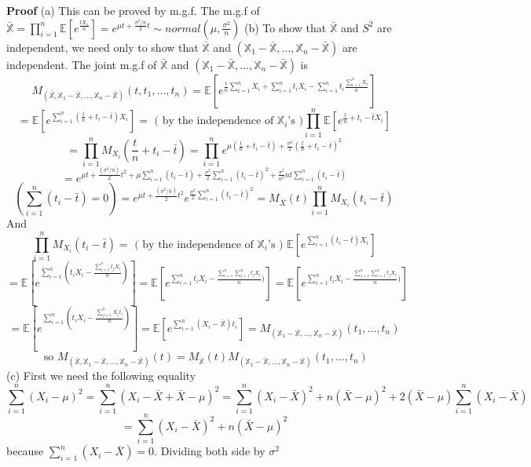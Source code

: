 \documentclass[a4paper,12pt]{article}
\begin{document}
\textbf{Proof} 
(a) This can be proved by m.g.f. The m.g.f of $\bar{\mathbb{X}} = \prod_{i=1}^n \mathbb{E}[e^{\frac{tX_1}{n}}] = e^{\mu t + \frac{\sigma^2 / n}{2}t} \sim normal(\mu, \frac{\sigma^2}{n})$ 
(b) To show that $\bar{\mathbb{X}}$ and $S^2$ are independent, we need only to show that $\bar{\mathbb{X}}$ and $(\mathbb{X}_1-\bar{\mathbb{X}}, ..., \mathbb{X}_n-\bar{\mathbb{X}})$ are independent.
The joint m.g.f of $\bar{\mathbb{X}}$ and $(\mathbb{X}_1-\bar{\mathbb{X}}, ..., \mathbb{X}_n-\bar{\mathbb{X}})$ is
$$M_{(\bar{\mathbb{X}}, \mathbb{X}_1-\bar{\mathbb{X}}, ..., \mathbb{X}_n-\bar{\mathbb{X}})}( t, t_1, ..., t_n ) = \mathbb{E}[e^{ \frac{t}{n}\sum_{i=1}^n X_i + \sum_{i=1}^n t_i X_i - \sum_{i=1}^n t_i \frac{\sum_{i=1}^n X_i}{n} }]$$
$$= \mathbb{E}[e^{\sum_{i=1}^n( \frac{t}{n}+t_i-\bar{t} )X_i}] = \text{ ( by the independence of } \mathbb{X}_i \text{'s )} \prod_{i=1}^n \mathbb{E}[e^{\frac{t}{n}+t_i-\bar{t} X_i}]$$
$$= \prod_{i=1}^n M_{X_i}(\frac{t}{n}+t_i-\bar{t}) = \prod_{i=1}^n e^{\mu (\frac{t}{n}+t_i-\bar{t}) + \frac{\sigma^2}{2} (\frac{t}{n}+t_i-\bar{t})^2 }$$
$$= e^{ \mu t + \frac{(\sigma^2/n)}{2}t^2 + \mu  \sum_{i=1}^n (t_i - \bar{t}) + \frac{\sigma^2}{2} \sum_{i=1}^n (t_i-\bar{t})^2 + \frac{\sigma^2}{n^2}nt \sum_{i=1}^n (t_i - \bar{t})}$$
$$( \sum_{i=1}^n (t_i - \bar{t}) = 0 ) = e^{ \mu t + \frac{(\sigma^2/n)}{2}t^2}e^{\frac{\sigma^2}{2} \sum_{i=1}^n (t_i-\bar{t})^2} = M_{\bar{X}}(t)\prod_{i=1}^n M_{X_i}(t_i-\bar{t})$$
And
$$\prod_{i=1}^n M_{X_i}(t_i-\bar{t}) =  \text{ ( by the independence of } \mathbb{X}_i \text{'s ) } \mathbb{E}[e^{ \sum_{i=1}^n (t_i-\bar{t})X_i }]$$
$$= \mathbb{E}[e^{ \sum_{i=1}^n (t_i X_i-\frac{\sum_{j=1}^n t_j X_i}{n}) }] = \mathbb{E}[e^{ \sum_{i=1}^n t_i X_i-\frac{\sum_{i=1}^n \sum_{j=1}^n t_j X_i}{n}) }] = \mathbb{E}[e^{ \sum_{i=1}^n t_i X_i-\frac{\sum_{j=1}^n \sum_{i=1}^n t_j X_i}{n}) }]$$
$$ = \mathbb{E}[e^{ \sum_{i=1}^n (t_i X_i-\frac{\sum_{j=1}^n X_j t_i}{n}) }] = \mathbb{E}[e^{ \sum_{i=1}^n (X_i-\bar{\mathbb{X}}) t_i} ] = M_{(\mathbb{X}_1-\bar{\mathbb{X}}, ..., \mathbb{X}_n-\bar{\mathbb{X}})}( t_1, ..., t_n )$$
$$\text{ so }M_{(\bar{\mathbb{X}}, \mathbb{X}_1-\bar{\mathbb{X}}, ..., \mathbb{X}_n-\bar{\mathbb{X}})}(t) = M_{\bar{\mathbb{X}}}(t) M_{(\mathbb{X}_1-\bar{\mathbb{X}}, ..., \mathbb{X}_n-\bar{\mathbb{X}})}( t_1, ..., t_n )$$ 
(c) First we need the following equality
$$\sum_{i=1}^n (X_i-\mu)^2 = \sum_{i=1}^n (X_i-\bar{X}+\bar{X}-\mu)^2 = \sum_{i=1}^n (X_i-\bar{X})^2 + n(\bar{X}-\mu)^2 + 2(\bar{X}-\mu)\sum_{i=1}^n(X_i-\bar{X})$$
$$= \sum_{i=1}^n (X_i-\bar{X})^2 + n(\bar{X}-\mu)^2$$ because $\sum_{i=1}^n(X_i-\bar{X}) = 0$. Dividing both side by $\sigma^2$
\end{document}

